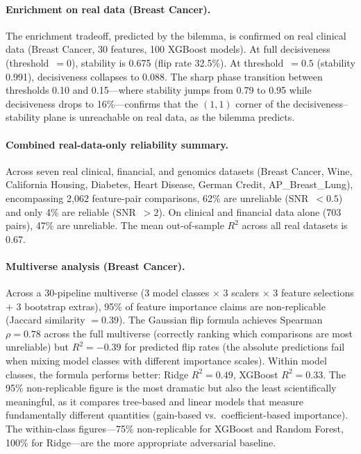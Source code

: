 \documentclass[11pt,a4paper]{article}
\begin{document}
\paragraph{Enrichment on real data (Breast Cancer).}
The enrichment tradeoff, predicted by the bilemma, is confirmed on real
clinical data (Breast Cancer, 30 features, 100 XGBoost models).  At full
decisiveness (threshold~$= 0$), stability is 0.675 (flip rate 32.5\%).  At
threshold~$= 0.5$ (stability 0.991), decisiveness collapses to 0.088.  The
sharp phase transition between thresholds 0.10 and 0.15---where stability
jumps from 0.79 to 0.95 while decisiveness drops to 16\%---confirms that the
$(1,1)$ corner of the decisiveness--stability plane is unreachable on real
data, as the bilemma predicts.

\paragraph{Combined real-data-only reliability summary.}
Across seven real clinical, financial, and genomics datasets (Breast Cancer,
Wine, California Housing, Diabetes, Heart Disease, German Credit,
AP\_Breast\_Lung), encompassing 2{,}062 feature-pair comparisons, 62\% are
unreliable (SNR~$< 0.5$) and only 4\% are reliable (SNR~$> 2$).  On clinical
and financial data alone (703 pairs), 47\% are unreliable.  The mean
out-of-sample $R^2$ across all real datasets is 0.67.

\paragraph{Multiverse analysis (Breast Cancer).}
Across a 30-pipeline multiverse (3 model classes $\times$ 3 scalers $\times$ 3 feature selections $+$ 3 bootstrap extras), 95\% of feature importance claims are non-replicable (Jaccard similarity $= 0.39$).  The Gaussian flip formula achieves Spearman $\rho = 0.78$ across the full multiverse (correctly ranking which comparisons are most unreliable) but $R^2 = -0.39$ for predicted flip rates (the absolute predictions fail when mixing model classes with different importance scales).  Within model classes, the formula performs better: Ridge $R^2 = 0.49$, XGBoost $R^2 = 0.33$.  The 95\% non-replicable figure is the most dramatic but also the least scientifically meaningful, as it compares tree-based and linear models that measure fundamentally different quantities (gain-based vs.\ coefficient-based importance).  The within-class figures---75\% non-replicable for XGBoost and Random Forest, 100\% for Ridge---are the more appropriate adversarial baseline.
\end{document}
